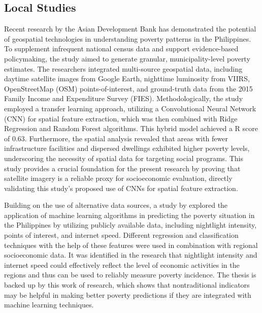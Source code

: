 \documentclass[12pt, letterpaper]{article}
\numberwithin{figure}{section}
\numberwithin{table}{section}
\begin{document}
\subsection{Local Studies}
Recent research by the Asian Development Bank \parencite{ADB2021} has
demonstrated the potential of geospatial technologies in
understanding poverty patterns in the Philippines. To supplement
infrequent national census data and support evidence-based
policymaking, the study aimed to generate granular,
municipality-level poverty estimates. The researchers integrated
multi-source geospatial data, including daytime satellite images from
Google Earth, nighttime luminosity from VIIRS, OpenStreetMap (OSM)
points-of-interest, and ground-truth data from the 2015 Family Income
and Expenditure Survey (FIES). Methodologically, the study employed a
transfer learning approach, utilizing a Convolutional Neural Network
(CNN) for spatial feature extraction, which was then combined with
Ridge Regression and Random Forest algorithms. This hybrid model
achieved a R score of 0.63. Furthermore, the spatial analysis
revealed that areas with fewer infrastructure facilities and
dispersed dwellings exhibited higher poverty levels, underscoring the
necessity of spatial data for targeting social programs. This study
provides a crucial foundation for the present research by proving
that satellite imagery is a reliable proxy for socioeconomic
evaluation, directly validating this study's proposed use of CNNs for
spatial feature extraction.

Building on the use of alternative data sources, a study by
\textcite{Aragoza2022} explored the application of machine learning
algorithms in predicting the poverty situation in the Philippines by
utilizing publicly available data, including nightlight intensity,
points of interest, and internet speed. Different regression and
classification techniques with the help of these features were used
in combination with regional socioeconomic data. It was identified in
the research that nightlight intensity and internet speed could
effectively reflect the level of economic activities in the regions
and thus can be used to reliably measure poverty incidence. The
thesis is backed up by this work of research, which shows that
nontraditional indicators may be helpful in making better poverty
predictions if they are integrated with machine learning techniques.
\end{document}
